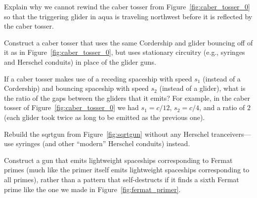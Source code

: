 \begin{multicols}{2}
	
	\mfilbreak
	
	
	\begin{problem}\label{exer:caber_tosser_rewind}
		Explain why we cannot rewind the caber tosser from Figure~\ref{fig:caber_tosser_0} so that the triggering glider in aqua is traveling northwest before it is reflected by the caber tosser.
	\end{problem}
	
	
	\mfilbreak
	
	
	\begin{problem}\label{exer:caber_tosser_stationary}
		Construct a caber tosser that uses the same Cordership and glider bouncing off of it as in Figure~\ref{fig:caber_tosser_0}, but uses stationary circuitry (e.g., syringes and Herschel conduits) in place of the glider guns.
	\end{problem}
	
	
	\mfilbreak
	
	
	\begin{problem}\label{exer:caber_tosser_different_speeds}
		If a caber tosser makes use of a receding spaceship with speed $s_1$ (instead of a Cordership) and bouncing spaceship with speed $s_2$ (instead of a glider), what is the ratio of the gaps between the gliders that it emits? For example, in the caber tosser of Figure~\ref{fig:caber_tosser_0} we had $s_1 = c/12$, $s_2 = c/4$, and a ratio of $2$ (each glider took twice as long to be emitted as the previous one).
	\end{problem}
	
	
	\mfilbreak
	
	
	\begin{problem}\label{exer:sqrtgun_standard}
		Rebuild the sqrtgun from Figure~\ref{fig:sqrtgun} without any Herschel tranceivers---use syringes (and other ``modern'' Herschel conduits) instead.
	\end{problem}
	
	
	\mfilbreak
	
	
	\begin{problem}\label{exer:construct_fermat_primer}
		Construct a gun that emits lightweight spaceships corresponding to Fermat primes (much like the primer itself emits lightweight spaceships corresponding to all primes), rather than a pattern that self-destructs if it finds a sixth Fermat prime like the one we made in Figure~\ref{fig:fermat_primer}.
	\end{problem}
	
	
	
	
	\mfilbreak
	

\end{multicols}
